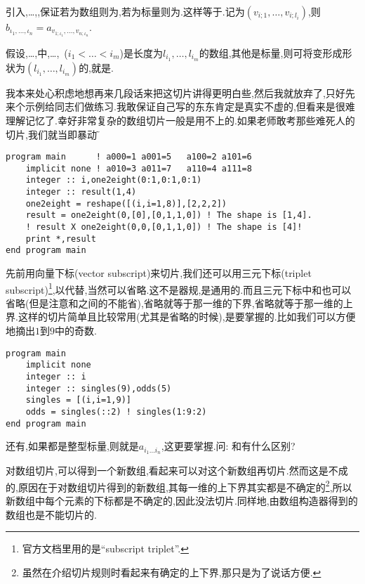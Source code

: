 引入,\dots,,保证若为数组则为,若为标量则为\ttt{[ei]}.这样等于.记为$(v_{i;1},\dots,v_{i;{l_i}})$,则$b_{{\iota_1},\dots,{\iota_n}}=a_{{v_{1;\iota_1}},\dots,{v_{n;\iota_n}}}$.

假设,\dots,中,\dots,\ ($i_1\!<\!\dots\!<\!i_m$)是长度为$l_{i_1},\dots,l_{i_m}$的数组,其他是标量,则可将变形成形状为$(l_{i_1},\dots,l_{i_m})$的,就是.

我本来处心积虑地想再来几段话来把这切片讲得更明白些,然后我就放弃了,只好先来个示例给同志们做练习.我敢保证自己写的东东肯定是真实不虚的,但看来是很难理解记忆了.幸好非常复杂的数组切片一般是用不上的.如果老师敢考那些难死人的切片,我们就当即暴动$\!\text{\~{}}$
\begin{lstlisting}
program main      ! a000=1 a001=5   a100=2 a101=6
    implicit none ! a010=3 a011=7   a110=4 a111=8
    integer :: i,one2eight(0:1,0:1,0:1)
    integer :: result(1,4)
    one2eight = reshape([(i,i=1,8)],[2,2,2])
    result = one2eight(0,[0],[0,1,1,0]) ! The shape is [1,4].
    ! result X one2eight(0,0,[0,1,1,0]) ! The shape is [4]!
    print *,result
end program main
\end{lstlisting}

先前用向量下标(vector subscript)来切片,我们还可以用三元下标(triplet subscript)\footnote{
官方文档里用的是``subscript triplet''.
},以代替,当然可以省略.这不是器规,是通用的.而且三元下标中和也可以省略(但是注意和之间的\ttt{:}不能省),省略就等于那一维的下界,省略就等于那一维的上界.这样的切片简单且比较常用(尤其是省略的时候),是要掌握的.比如我们可以方便地摘出$1$到$9$中的奇数.
\begin{lstlisting}
program main
    implicit none
    integer :: i
    integer :: singles(9),odds(5)
    singles = [(i,i=1,9)]
    odds = singles(::2) ! singles(1:9:2)
end program main
\end{lstlisting}
还有,如果都是整型标量,则就是$a_{i_1\dots i_n}$,这更要掌握.问: 和有什么区别?

对数组切片,可以得到一个新数组,看起来可以对这个新数组再切片.然而这是不成的,原因在于对数组切片得到的新数组,其每一维的上下界其实都是不确定的\footnote{
虽然在介绍切片规则时看起来有确定的上下界,那只是为了说话方便.
},所以新数组中每个元素的下标都是不确定的,因此没法切片.同样地,由数组构造器得到的数组也是不能切片的.


